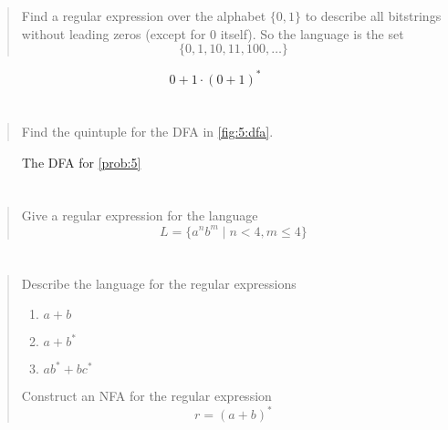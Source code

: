 \documentclass{article}
\begin{document}
\section{}
\begin{quote}
    Find a regular expression over the alphabet $\{0, 1\}$ to describe all bitstrings without
    leading zeros (except for 0 itself). So the language is the set
    \[ \{0, 1, 10, 11, 100, \dots \} \]
\end{quote}

\[ 0 + 1 \cdot {(0 + 1)}^*\]

\section{}\label{prob:5}
\begin{quote}
    Find the quintuple for the DFA in \autoref{fig:5:dfa}.
\end{quote}

\begin{figure}[h]
    \centering
    \caption{The DFA for \autoref{prob:5}}\label{fig:5:dfa}
\end{figure}

\section{}
\begin{quote}
    Give a regular expression for the language
    \[L = \{a^n b^m \mid n < 4, m \leq 4\} \]
\end{quote}

\section{}
\begin{quote}
    Describe the language for the regular expressions
    \begin{enumerate}
        \item $a + b$
        \item $a + b^*$
        \item $ab^* + bc^*$
    \end{enumerate}
    Construct an NFA for the regular expression
    \[r = {(a + b)}^*\]
\end{quote}
\end{document}
